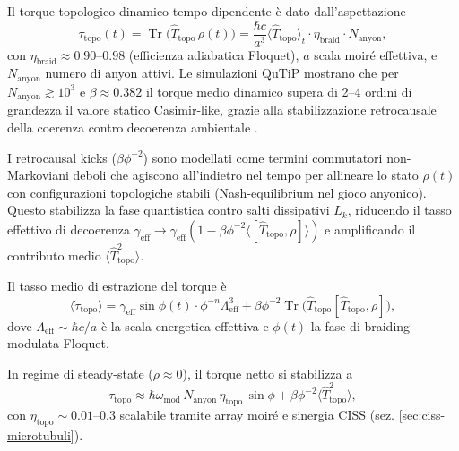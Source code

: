 \documentclass[11pt,a4paper]{article}
\let\oldcite\cite
\renewcommand{\cite}{\protect\oldcite}
\let\oldref\ref
\renewcommand{\ref}{\protect\oldref}
\theoremstyle{plain}
\theoremstyle{definition}
\begin{document}
Il torque topologico dinamico tempo-dipendente è dato dall'aspettazione
\begin{equation}
\tau_{\mathrm{topo}}(t) = \operatorname{Tr} \bigl( \hat{T}_{\mathrm{topo}} \, \rho(t) \bigr) = \frac{\hbar c}{a^3} \langle \hat{T}_{\mathrm{topo}} \rangle_t \cdot \eta_{\mathrm{braid}} \cdot N_{\mathrm{anyon}},
\label{eq:dynamic-torque-time}
\end{equation}
con $\eta_{\mathrm{braid}} \approx 0.90$--$0.98$ (efficienza adiabatica Floquet), $a$ scala moiré effettiva, e $N_{\mathrm{anyon}}$ numero di anyon attivi. Le simulazioni QuTiP mostrano che per $N_{\mathrm{anyon}} \gtrsim 10^3$ e $\beta \approx 0.382$ il torque medio dinamico supera di 2–4 ordini di grandezza il valore statico Casimir-like, grazie alla stabilizzazione retrocausale della coerenza contro decoerenza ambientale \cite{PhysSoliman2026b}.

I retrocausal kicks ($\beta \phi^{-2}$) sono modellati come termini commutatori non-Markoviani deboli che agiscono all'indietro nel tempo per allineare lo stato $\rho(t)$ con configurazioni topologiche stabili (Nash-equilibrium nel gioco anyonico). Questo stabilizza la fase quantistica contro salti dissipativi $L_k$, riducendo il tasso effettivo di decoerenza $\gamma_{\mathrm{eff}} \to \gamma_{\mathrm{eff}} (1 - \beta \phi^{-2} \langle [\hat{T}_{\mathrm{topo}}, \rho] \rangle)$ e amplificando il contributo medio $\langle \hat{T}_{\mathrm{topo}}^2 \rangle$.

Il tasso medio di estrazione del torque è
\begin{equation}
\langle \dot{\tau}_{\mathrm{topo}} \rangle = \gamma_{\mathrm{eff}} \sin\phi(t) \cdot \phi^{-n} \Lambda_{\mathrm{eff}}^3 + \beta \phi^{-2} \operatorname{Tr} \bigl( \hat{T}_{\mathrm{topo}} [\hat{T}_{\mathrm{topo}}, \rho] \bigr),
\label{eq:torque-rate-lindblad}
\end{equation}
dove $\Lambda_{\mathrm{eff}} \sim \hbar c / a$ è la scala energetica effettiva e $\phi(t)$ la fase di braiding modulata Floquet.

In regime di steady-state ($\dot{\rho} \approx 0$), il torque netto si stabilizza a
\begin{equation}
\tau_{\mathrm{topo}} \approx \hbar \omega_{\mathrm{mod}} \, N_{\mathrm{anyon}} \, \eta_{\mathrm{topo}} \, \sin\phi + \beta \phi^{-2} \langle \hat{T}_{\mathrm{topo}}^2 \rangle,
\label{eq:steady-torque-lindblad}
\end{equation}
con $\eta_{\mathrm{topo}} \sim 0.01$--$0.3$ scalabile tramite array moiré e sinergia CISS (sez. \ref{sec:ciss-microtubuli}).
\end{document}
